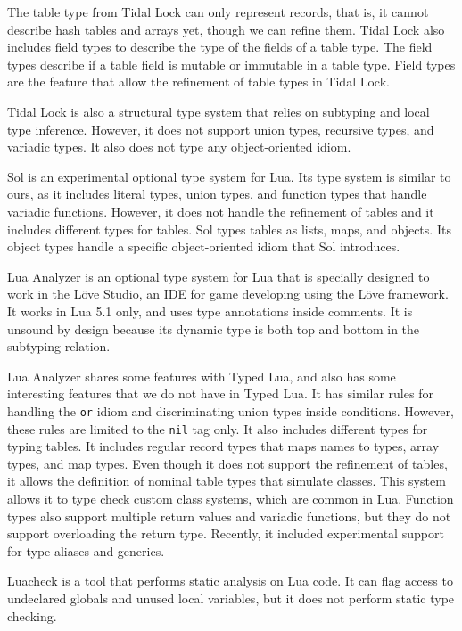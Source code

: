 The table type from Tidal Lock can only represent records, that is,
it cannot describe hash tables and arrays yet, though we can refine them.
Tidal Lock also includes field types to describe the type of the fields
of a table type.
The field types describe if a table field is mutable or immutable
in a table type.
Field types are the feature that allow the refinement of table types in
Tidal Lock.

Tidal Lock is also a structural type system that relies on subtyping and
local type inference.
However, it does not support union types, recursive types, and variadic types.
It also does not type any object-oriented idiom.

Sol \citep{sol} is an experimental optional type system for Lua.
Its type system is similar to ours, as it includes literal types,
union types, and function types that handle variadic functions.
However, it does not handle the refinement of tables and it
includes different types for tables.
Sol types tables as lists, maps, and objects.
Its object types handle a specific object-oriented idiom that
Sol introduces.

Lua Analyzer \citep{luaanalyzer} is an optional type system for Lua
that is specially designed to work in the Löve Studio,
an IDE for game developing using the Löve framework.
It works in Lua 5.1 only, and uses type annotations inside comments.
It is unsound by design because its dynamic type is both
top and bottom in the subtyping relation.

Lua Analyzer shares some features with Typed Lua, and also
has some interesting features that we do not have in Typed Lua.
It has similar rules for handling the \texttt{or} idiom and
discriminating union types inside conditions.
However, these rules are limited to the \texttt{nil} tag only.
It also includes different types for typing tables.
It includes regular record types that maps names to types,
array types, and map types.
Even though it does not support the refinement of tables,
it allows the definition of nominal table types that simulate classes.
This system allows it to type check custom class systems,
which are common in Lua.
Function types also support multiple return values and
variadic functions, but they do not support overloading the
return type.
Recently, it included experimental support for type aliases and generics.

Luacheck \citep{luacheck} is a tool that performs static analysis on Lua code.
It can flag access to undeclared globals and unused local variables,
but it does not perform static type checking.

